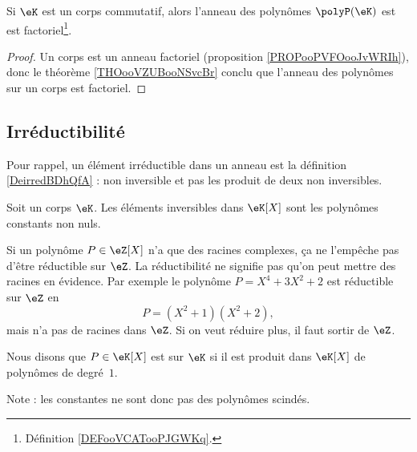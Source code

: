 \begin{proposition}     \label{PropqGZXvr}
	Si \( \eK\) est un corps commutatif, alors l'anneau des polynômes \( \polyP(\eK)\) est est factoriel\footnote{Définition \ref{DEFooVCATooPJGWKq}.}.
\end{proposition}

\begin{proof}
	Un corps est un anneau factoriel (proposition \ref{PROPooPVFOooJvWRIh}), donc le théorème \ref{THOooVZUBooNSvcBr} conclu que l'anneau des polynômes sur un corps est factoriel.
\end{proof}

\subsection{Irréductibilité}

Pour rappel, un élément irréductible dans un anneau est la définition \ref{DeirredBDhQfA} : non inversible et pas les produit de deux non inversibles.

\begin{lemma}       \label{LEMooTMSUooCWoVHG}
	Soit un corps \( \eK\). Les éléments inversibles dans \( \eK[X]\) sont les polynômes constants non nuls.
\end{lemma}

\begin{example}
	Si un polynôme \( P\in \eZ[X]\) n'a que des racines complexes, ça ne l'empêche pas d'être réductible sur \( \eZ\). La réductibilité ne signifie pas qu'on peut mettre des racines en évidence. Par exemple le polynôme \( P=X^4+3X^2+2\) est réductible sur \( \eZ\) en
	\begin{equation}
		P=(X^2+1)(X^2+2),
	\end{equation}
	mais n'a pas de racines dans \( \eZ\). Si on veut réduire plus, il faut sortir de \( \eZ\).

\end{example}

\begin{definition}  \label{DefCPLSooQaHJKQ}
	Nous disons que \( P\in\eK[X]\) est  sur \(\eK\) si il est produit dans \(\eK[X]\) de polynômes de degré~\( 1\).
\end{definition}
Note : les constantes ne sont donc pas des polynômes scindés.

